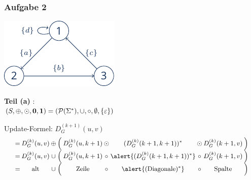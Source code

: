 \documentclass{beamer}
\begin{document}


\begin{frame} \frametitle{Aufgabe 2}
	\begin{minipage}{\dimexpr0.5\linewidth-\fboxrule-\fboxsep}
		\includegraphics[width=\linewidth]{./tut12_task2-graph.pdf}
	\end{minipage} 
	\pause
	\begin{minipage}{\dimexpr0.5\linewidth-\fboxrule-\fboxsep}
		\centering
		\textbf{Teil (a)} : \\
		$(S, \oplus, \odot, \mathbf{0}, \mathbf{1}) = (\mathcal{P}(\Sigma^\ast), \cup, \circ, \emptyset, \left\{ \varepsilon \right\})$
	\end{minipage}

	\hspace{1em} \pause
	
	Update-Formel: $D_G^{(k+1)}(u,v)$
	\begin{equation*}
	\small
	\setlength{\arraycolsep}{1pt}
		\begin{array}{rccrcccccr}
			=& D_G^{(k)}(u,v) &\oplus& \Big( & D_G^{(k)}(u,k+1) &\odot& (D_G^{(k)}(k+1,k+1))^\ast &\odot& D_G^{(k)}(k+1,v) & \Big) \\
			=& D_G^{(k)}(u,v) &\cup& \Big( & D_G^{(k)}(u,k+1) &\circ& \alert{(D_G^{(k)}(k+1,k+1))^\ast} &\circ& D_G^{(k)}(k+1,v) & \Big) \\
			=& \text{alt} &\cup& \Big(& \text{Zeile} &\circ& \alert{(\text{Diagonale})^\ast} &\circ& \text{Spalte} & \Big)
		\end{array}
	\end{equation*}
\end{frame}
\end{document}
